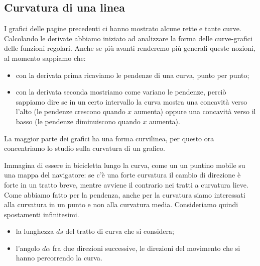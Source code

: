 \subsection{Curvatura di una linea}
I grafici delle pagine precedenti ci hanno mostrato alcune rette e tante curve. 
Calcolando le derivate abbiamo iniziato ad analizzare la forma delle 
curve-grafici delle funzioni regolari. Anche se più avanti renderemo più 
generali queste nozioni, al momento sappiamo che:
\begin{itemize}[nosep]
 \item con la derivata prima ricaviamo le pendenze di una curva, punto per 
punto;
\item con la derivata seconda mostriamo come variano le pendenze, perciò 
sappiamo dire se in un certo intervallo la curva mostra una concavità 
verso l'alto (le pendenze crescono quando \(x\) aumenta) oppure una 
concavità verso il basso (le pendenze diminuiscono quando \(x\) aumenta).
\end{itemize}
La maggior parte dei grafici ha una forma curvilinea, per questo ora 
concentriamo lo studio sulla curvatura di un grafico. 

Immagina di essere in 
bicicletta lungo la curva, come un un puntino mobile su una mappa del 
navigatore: se c'è una forte curvatura il cambio di direzione è forte in un 
tratto breve, mentre avviene il contrario nei tratti a curvatura lieve. 
Come abbiamo fatto per la pendenza, anche per la curvatura siamo interessati 
alla curvatura in un punto e non alla curvatura media. Consideriamo quindi 
spostamenti infinitesimi.
\begin{itemize}[nosep]
\item la lunghezza \(ds\) del tratto di curva che si considera;
 \item l'angolo \(d\alpha\) fra due direzioni successive, le direzioni del 
movimento che si hanno percorrendo la curva.
\end{itemize}

